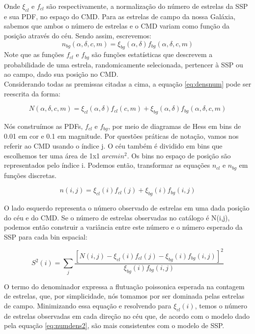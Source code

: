 \documentclass[
	12pt,				%
	openany,			%
	oneside,			%
	a4paper,			%
	english,			%
	brazil				%
	]{abntex2}
\begin{document}
Onde $\xi_{cl}$ e $f_{cl}$ são respectivamente, a normalização do número de estrelas da SSP e sua PDF, no espaço do CMD. Para as estrelas de campo da nossa Galáxia, sabemos que ambos o número de estrelas e o CMD variam como função da posição através do céu. Sendo assim, escrevemos:
\begin{equation}
n_{bg}(\alpha,\delta,c,m) = \xi_{bg}(\alpha,\delta)f_{bg} (\alpha,\delta,c,m) 
\end{equation}
Note que as funções $f_{cl}$ e $f_{bg}$ são funções estatísticas que descrevem a probabilidade de uma estrela, randomicamente selecionada, pertencer à SSP ou ao campo,  dado sua posição no CMD. \\ 
Considerando todas as premissas citadas a cima,  a equação \ref{eq:densnum} pode ser reescrita da forma:

\begin{equation} \label{eq:numdens2}
N(\alpha,\delta,c,m) = \xi_{cl}(\alpha,\delta)f_{cl} (c,m) + \xi_{bg}(\alpha,\delta)f_{bg} (\alpha,\delta,c,m) 
\end{equation}
 
Nós construímos as PDFs, $f_{cl}$ e $f_{bg}$, por meio de diagramas de Hess em bins de 0.01 em cor e 0.1 em magnitude. Por questões práticas de notação, vamos nos referir ao CMD usando o índice j. O céu também é dividido em bins que escolhemos ter uma área de 1x1 $arcmin^2$. Os bins no espaço de posição são representados pelo índice i. Podemos então, transformar as equações  $n_{cl}$ e $n_{bg}$ em funções discretas.

\begin{equation}
n(i,j) = \xi_{cl}(i)f_{cl} (j) + \xi_{bg}(i)f_{bg} (i,j) 
\end{equation}

O lado esquerdo representa o número observado de estrelas em uma dada posição do céu e do CMD. Se o número de estrelas observadas no catálogo é N(i,j), podemos então construir a variância entre este número e o número esperado da SSP para cada bin espacial: 

\begin{equation}
S^2(i) = \sum\limits_{j}\frac{[N(i,j)  - \xi_{cl}(i) f_{cl}(j)  - \xi_{bg}(i) f_{bg}(i,j)]^2}{\xi_{bg}(i)f_{bg}(i,j)}
\end{equation}

O termo do denominador expressa a flutuação poissonica esperada na contagem de estrelas, que, por simplicidade, nós tomamos por ser dominada pelas estrelas de campo. Minimizando essa equação e resolvendo para $\xi_{cl}(i)$,  temos o número de estrelas observadas em cada direção no céu que, de acordo com o modelo dado pela equação \ref{eq:numdens2}, são mais consistentes com o modelo de SSP.
\end{document}
